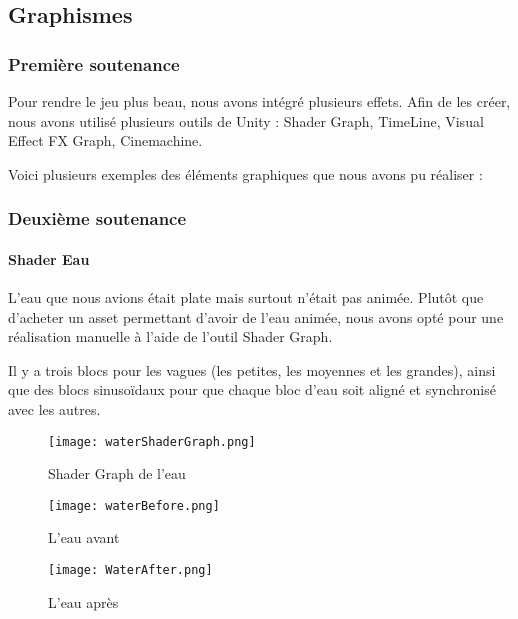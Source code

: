\subsection{Graphismes}

    \subsubsection{Première soutenance}

        Pour rendre le jeu plus beau, nous avons intégré plusieurs effets.
        Afin de les créer, nous avons utilisé plusieurs outils de Unity :
        Shader Graph, TimeLine, Visual Effect FX Graph, Cinemachine.

        Voici plusieurs exemples des éléments graphiques que nous avons pu réaliser : 

    \subsubsection{Deuxième soutenance}

        \paragraph{Shader Eau}

        L'eau que nous avions était plate mais surtout n'était pas animée.
        Plutôt que d'acheter un asset permettant d'avoir de l'eau animée,
        nous avons opté pour une réalisation manuelle à l'aide de l'outil Shader Graph.

        Il y a trois blocs pour les vagues (les petites, les moyennes et les grandes),
        ainsi que des blocs sinusoïdaux pour que chaque bloc d'eau soit aligné et synchronisé avec les autres.
        \begin{figure}[hbt!]
            \centering
            \texttt{[image: waterShaderGraph.png]}
            \caption{Shader Graph de l'eau}
        \end{figure}
        \begin{figure}[hbt!]
            \centering
            \texttt{[image: waterBefore.png]}
            \caption{L'eau avant}
        \end{figure}
        \begin{figure}[hbt!]
            \centering
            \texttt{[image: WaterAfter.png]}
            \caption{L'eau après}
        \end{figure}
        \FloatBarrier



